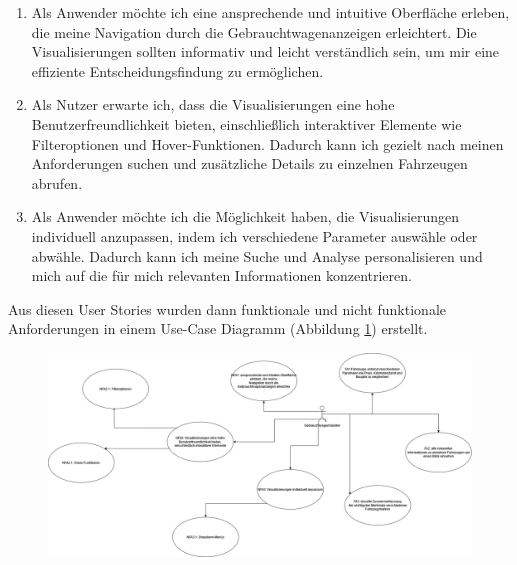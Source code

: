 \begin{enumerate}
    \item Als Anwender möchte ich eine ansprechende und intuitive Oberfläche erleben, die meine Navigation durch die Gebrauchtwagenanzeigen erleichtert. Die Visualisierungen sollten informativ und leicht verständlich sein, um mir eine effiziente Entscheidungsfindung zu ermöglichen.
    
    \item Als Nutzer erwarte ich, dass die Visualisierungen eine hohe Benutzerfreundlichkeit bieten, einschließlich interaktiver Elemente wie Filteroptionen und Hover-Funktionen. Dadurch kann ich gezielt nach meinen Anforderungen suchen und zusätzliche Details zu einzelnen Fahrzeugen abrufen.
    
    \item Als Anwender möchte ich die Möglichkeit haben, die Visualisierungen individuell anzupassen, indem ich verschiedene Parameter auswähle oder abwähle. Dadurch kann ich meine Suche und Analyse personalisieren und mich auf die für mich relevanten Informationen konzentrieren.
    
\end{enumerate}

Aus diesen User Stories wurden dann funktionale und nicht funktionale Anforderungen in einem Use-Case Diagramm (Abbildung \ref*{fig:uc_diagram}) erstellt. \\
\begin{figure}
    \centering
    \includegraphics[scale=0,5]{img/uc_diagram.png}
    \label{fig:uc_diagram}
\end{figure}


